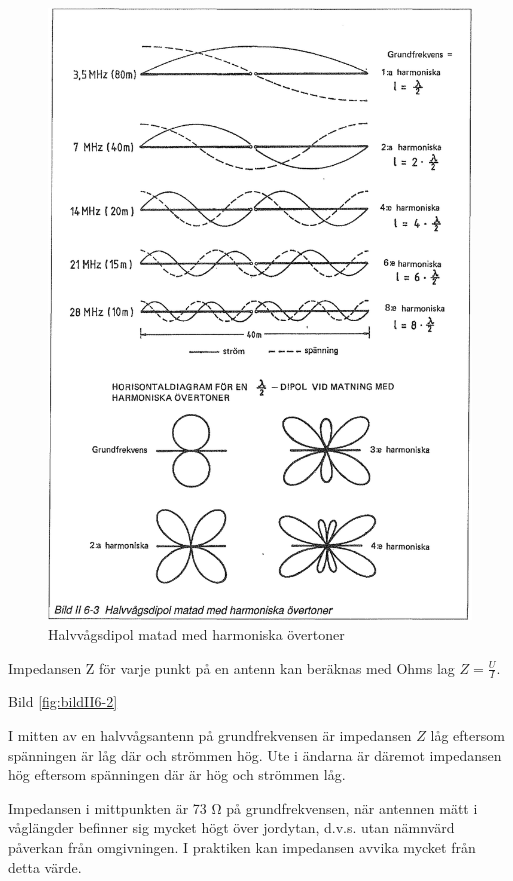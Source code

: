 \begin{figure}
  \includegraphics[width=\textwidth]{images/bild_2_6-03}
  \caption{Halvvågsdipol matad med harmoniska övertoner}
  \label{fig:bildII6-3}
\end{figure}

Impedansen Z för varje punkt på en antenn kan beräknas med Ohms lag
\(Z = \frac{U}{I}\).

Bild \ref{fig:bildII6-2}

I mitten av en halvvågsantenn på grundfrekvensen är impedansen \(Z\)
låg eftersom spänningen är låg där och strömmen hög.  Ute i ändarna är
däremot impedansen hög eftersom spänningen där är hög och strömmen
låg.

Impedansen i mittpunkten är 73 Ω på grundfrekvensen, när antennen mätt
i våglängder befinner sig mycket högt över jordytan, d.v.s. utan
nämnvärd påverkan från omgivningen. I praktiken kan impedansen avvika
mycket från detta värde.

